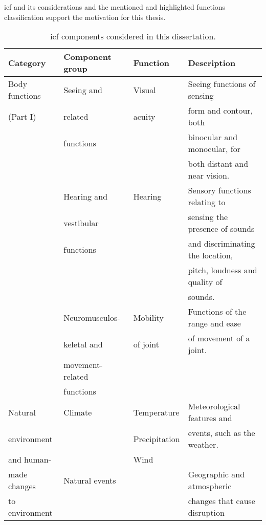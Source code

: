 

\ac{icf} and its considerations and the mentioned and highlighted functions
classification support the motivation for this thesis.

\begin{table}
  \caption{\ac{icf} components considered in this dissertation.}
  \label{tbl:icf}
  \footnotesize
  \centering
  \begin{tabular}{l l l l}
    \hline
    \textbf{Category} 	& \textbf{Component group}& \textbf{Function}& \textbf{Description}\\
    \hline
    Body functions& Seeing and 	 	& Visual 	& Seeing functions of sensing	\\
    (Part I)	& related		& acuity	& form and contour, both 	\\
		& functions		& 		& binocular and monocular, for 	\\
		& 			& 		& both distant and near vision.	\\
		& Hearing and 		& Hearing 	& Sensory functions relating to \\
		& vestibular		& 		& sensing the presence of sounds\\
		& functions		& 		& and discriminating the location,\\
		& 			&		& pitch, loudness and quality of\\
		&			&		& sounds.			\\
		& Neuromusculos- 	& Mobility	& Functions of the range and ease\\ 
		& keletal and 		& of joint	& of movement of a joint.	\\
		& movement-related 	& 		& 				\\
		& functions		&		&				\\
    \hline
    Natural 	& Climate		& Temperature	& Meteorological features and 	\\
    environment & 			& Precipitation	& events, such as the weather.	\\
    and human-	&			& Wind		& 				\\
    made changes& Natural events	& 		& Geographic and atmospheric 	\\
    to environment& 			& 		& changes that cause disruption \\

\end{tabular}
\end{table}

